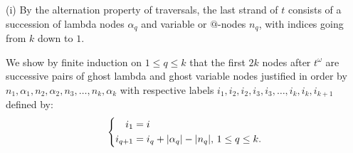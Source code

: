 \documentclass{article}
\theoremstyle{definition}
\begin{document}
\proofatend
(i) By the alternation property of traversals, the last strand of $t$ consists of a succession of lambda nodes $\alpha_q$ and variable or $@$-nodes $n_q$, with indices going from $k$ down to $1$.

We show by finite induction on $1 \leq q \leq k$ that the first $2k$ nodes after $t^\omega$ are successive pairs of ghost lambda and ghost variable nodes justified in order by $n_1, \alpha_1, n_2, \alpha_2, n_3, \ldots, n_k, \alpha_k$ with respective labels $i_1, i_2, i_2, i_3, i_3, \ldots, i_k, i_k, i_{k+1}$ defined by:
\begin{equation*}
\left\{
    \begin{aligned}
    i_1 &= i \\
    i_{q+1} &= i_q + |\alpha_q| - |n_q| \hbox{, $1\leq q \leq k$}.
    \end{aligned}
\right.
\end{equation*}
\end{document}
